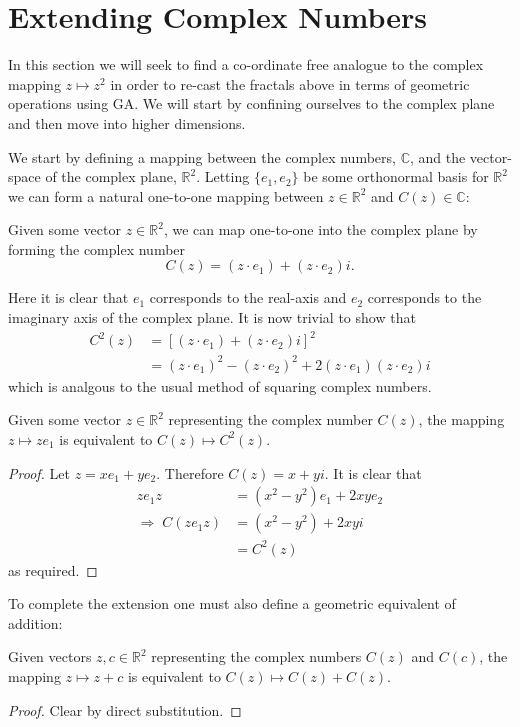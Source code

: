 \section{Extending Complex Numbers}

In this section we will seek to find a co-ordinate free analogue to the
complex mapping $z \mapsto z^2$ in order to re-cast the fractals above in
terms of geometric operations using GA. We will start by confining ourselves
to the complex plane and then move into higher dimensions.

We start by defining a mapping between the complex numbers, $\mathbb{C}$, and
the vector-space of the complex plane, $\mathbb{R}^2$. Letting $\{e_1, e_2\}$
be some orthonormal basis for $\mathbb{R}^2$ we can form a natural one-to-one
mapping between $z \in \mathbb{R}^2$ and $C(z) \in \mathbb{C}$:

\begin{definition}
Given some vector $z \in \mathbb{R}^2$, we can map one-to-one into the
complex plane by forming the complex number
\[
C(z) = (z \cdot e_1) + (z \cdot e_2)i.
\]
\end{definition}

Here it is clear that $e_1$ corresponds to the real-axis and $e_2$ 
corresponds to the imaginary axis of the complex plane.
It is now trivial to show that
\begin{align*}
C^2(z) &= [(z \cdot e_1) + (z \cdot e_2)i]^2 \\
       &= (z \cdot e_1)^2 - (z \cdot e_2)^2 + 2(z \cdot e_1)(z \cdot e_2)i
\end{align*}
which is analgous to the usual method of squaring complex numbers.

\begin{lemma}
Given some vector $z \in \mathbb{R}^2$ representing the complex number
$C(z)$, the mapping $z \mapsto ze_1$ is equivalent to $C(z) \mapsto C^2(z)$.
\end{lemma}
\begin{proof}
Let $z = xe_1 + ye_2$. Therefore $C(z) = x + yi$. It is clear that
\begin{align*}
ze_1z &= (x^2 - y^2) e_1 + 2xye_2 \\
\Rightarrow\;C(ze_1z) &= (x^2 - y^2) + 2xyi\\
        &= C^2(z)
\end{align*}
as required.
\end{proof}

To complete the extension one must also define a geometric equivalent of
addition:
\begin{lemma}
Given vectors $z, c \in \mathbb{R}^2$ representing the complex numbers
$C(z)$ and $C(c)$, the mapping $z \mapsto z + c$ is equivalent to 
$C(z) \mapsto C(z) + C(z)$.
\end{lemma}
\begin{proof}
Clear by direct substitution.
\end{proof}

